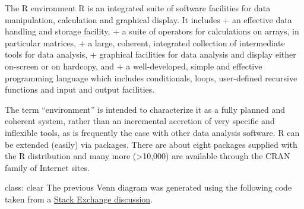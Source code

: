 \documentclass[
  ignorenonframetext,
]{beamer}
\begin{document}
\begin{frame}[fragile]{The R environment}
\protect\hypertarget{the-r-environment}{}
R is an integrated suite of software facilities for data manipulation,
calculation and graphical display. It includes + an effective data
handling and storage facility, + a suite of operators for calculations
on arrays, in particular matrices, + a large, coherent, integrated
collection of intermediate tools for data analysis, + graphical
facilities for data analysis and display either on-screen or on
hardcopy, and + a well-developed, simple and effective programming
language which includes conditionals, loops, user-defined recursive
functions and input and output facilities.

The term ``environment'' is intended to characterize it as a fully
planned and coherent system, rather than an incremental accretion of
very specific and inflexible tools, as is frequently the case with other
data analysis software. R can be extended (easily) via packages. There
are about eight packages supplied with the R distribution and many more
(\textgreater10,000) are available through the CRAN family of Internet
sites.

class: clear The previous Venn diagram was generated using the following
code taken from a
\href{https://datascience.stackexchange.com/questions/2403/data-science-without-knowledge-of-a-specific-topic-is-it-worth-pursuing-as-a-ca}{Stack
Exchange discussion}.


\end{frame}
\end{document}
